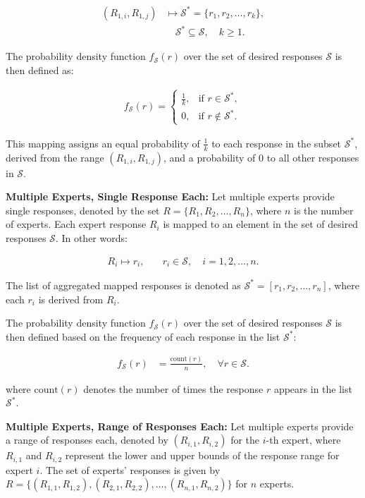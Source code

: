 \begin{align*}
(R_{1,i}, R_{1,j}) & \mapsto \mathcal{S}^* = \{r_1, r_2, \ldots, r_k\}, \\
& \quad \mathcal{S}^* \subseteq \mathcal{S}, \quad k \geq 1.
\end{align*}


The probability density function $f_{\mathcal{S}}(r)$ over the set of desired responses $\mathcal{S}$ is then defined as:

\begin{align*}
f_{\mathcal{S}}(r) = 
\begin{cases}
\frac{1}{k}, & \text{if } r \in \mathcal{S}^*, \\
0, & \text{if } r \notin \mathcal{S}^*.
\end{cases}
\end{align*}


This mapping assigns an equal probability of $\frac{1}{k}$ to each response in the subset $\mathcal{S}^*$, derived from the range $(R_{1,i}, R_{1,j})$, and a probability of 0 to all other responses in $\mathcal{S}$.


{\bf Multiple Experts, Single Response Each:} Let multiple experts provide single responses, denoted by the set $R = \{R_1, R_2, \ldots, R_n\}$, where $n$ is the number of experts. Each expert response $R_i$ is mapped to an element in the set of desired responses $\mathcal{S}$. In other words:

\begin{align*}
R_i \mapsto r_i, \quad & r_i \in \mathcal{S}, \quad i = 1, 2, \ldots, n.
\end{align*}


The list of aggregated mapped responses is denoted as $\mathcal{S}^* = [r_1, r_2, \ldots, r_n]$, where each $r_i$ is derived from $R_i$.

The probability density function $f_{\mathcal{S}}(r)$ over the set of desired responses $\mathcal{S}$ is then defined based on the frequency of each response in the list $\mathcal{S}^*$:

\begin{align*}
f_{\mathcal{S}}(r) &= \frac{\text{count}(r)}{n}, \quad \forall r \in \mathcal{S}.
\end{align*}


where $\text{count}(r)$ denotes the number of times the response $r$ appears in the list $\mathcal{S}^*$. 



\textbf{Multiple Experts, Range of Responses Each:} Let multiple experts provide a range of responses each, denoted by $(R_{i,1}, R_{i,2})$ for the $i$-th expert, where $R_{i,1}$ and $R_{i,2}$ represent the lower and upper bounds of the response range for expert $i$. The set of experts' responses is given by $R = \{(R_{1,1}, R_{1,2}), (R_{2,1}, R_{2,2}), \ldots, (R_{n,1}, R_{n,2})\}$ for $n$ experts.

